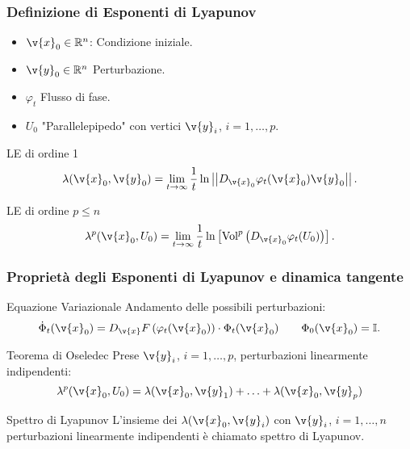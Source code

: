\begin{frame}
\frametitle{Definizione di Esponenti di Lyapunov}
\begin{itemize}
    \item $\v{x}_0\in \mathbb{R}^n$: Condizione iniziale.
    \item $\v{y}_0\in \mathbb{R}^n$ Perturbazione.
    \item $\varphi_t$ Flusso di fase.
    \item $U_0$ "Parallelepipedo" con vertici $\v{y}_i$, $i = 1, \ldots , p$.
\end{itemize}
\begin{block}{LE di ordine 1}
\[
    \lambda (\v{x}_0, \v{y}_0) = \lim_{t \to \infty} \frac{1}{t}\ln\left|\left|D_{\v{x}_0}\varphi_t(\v{x}_0) \v{y}_0\right|\right|
.\] 
\end{block}
\begin{block}{LE di ordine $p\le n$}
\[
    \lambda^p(\v{x}_0, U_0) = \lim_{t \to \infty} \frac{1}{t}\ln\left[\text{Vol}^p\left(D_{\v{x}_0}\varphi_t(U_0)\right)\right]
.\]
\end{block}
\end{frame}

\begin{frame}
\frametitle{Proprietà degli Esponenti di Lyapunov e dinamica tangente}
\begin{block}{Equazione Variazionale}
Andamento delle possibili perturbazioni:
\[
    \dot{\Phi}_t (\v{x}_0)  = D_{\v{x}}F\left(\varphi_t(\v{x}_0) \right)\cdot \Phi_t(\v{x}_0) \qquad  \Phi_0(\v{x}_0) = \mathbb{I}
.\] 
\end{block}
\begin{block}{Teorema di Oseledec}
Prese $\v{y}_i$, $i=1, \ldots, p$, perturbazioni linearmente indipendenti:
\begin{equation}
    \lambda^p(\v{x}_0, U_0)  = \lambda(\v{x}_0, \v{y}_1)  + \ldots + \lambda(\v{x}_0, \v{y}_p) 
    \label{eq:sumlambda}
\end{equation}
\end{block}
\begin{block}{Spettro di Lyapunov}
    L'insieme dei $\lambda (\v{x}_0, \v{y}_i)$ con $\v{y}_i$, $i = 1, \ldots, n$ perturbazioni linearmente indipendenti è chiamato spettro di Lyapunov.
\end{block}
\end{frame}

